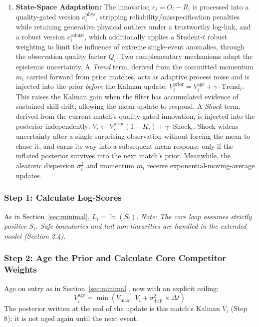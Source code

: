 \documentclass[12pt]{article}
\newcommand{\sigmai}{\sigma_i^2}
\newcommand{\sdrift}{\sigma_{\mathrm{drift}}^2}
\newcommand{\ephys}{e_i^{\mathrm{phys}}}
\newcommand{\erobust}{e_i^{\mathrm{robust}}}
\begin{document}
\begin{enumerate}
		\item \textbf{State-Space Adaptation:}
		The innovation \(e_i = O_i - R_i\) is processed into a quality-gated version \(\ephys\), stripping reliability/misspecification penalties while retaining generative physical outliers under a trustworthy log-link, and a robust version \(\erobust\), which additionally applies a Student-$t$ robust weighting to limit the influence of extreme single-event anomalies, through the observation quality factor \(Q_i\).
		Two complementary mechanisms adapt the epistemic uncertainty. A \textit{Trend} term, derived from the committed momentum \(m_i\) carried forward from prior matches, acts as adaptive process noise and is injected into the prior \emph{before} the Kalman update: \(V_i^{\mathrm{prior}} = V_i^{\mathrm{age}} + \gamma \cdot \text{Trend}_i\). This raises the Kalman gain when the filter has accumulated evidence of sustained skill drift, allowing the mean update to respond. A \textit{Shock} term, derived from the current match's quality-gated innovation, is injected into the posterior independently: \(V_i \leftarrow V_i^{\mathrm{prior}}(1 - K_i) + \gamma \cdot \text{Shock}_i\). Shock widens uncertainty after a single surprising observation without forcing the mean to chase it, and earns its way into a subsequent mean response only if the inflated posterior survives into the next match's prior.
		Meanwhile, the aleatoric dispersion \(\sigmai\) and momentum \(m_i\) receive exponential-moving-average updates.

	\end{enumerate}

	\subsubsection*{Step 1: Calculate Log-Scores}
	As in Section~\ref{sec:minimal}, $L_i = \ln(S_i)$.
	\textit{Note: The core loop assumes strictly positive $S_i$. Safe boundaries and tail non-linearities are handled in the extended model (Section 2.4).}

	\subsubsection*{Step 2: Age the Prior and Calculate Core Competitor Weights}
	Age on entry as in Section~\ref{sec:minimal}, now with an explicit ceiling:
	\begin{equation}
		V_i^{\mathrm{age}} = \min\!\left(V_{\max},\; V_i + \sdrift \times \Delta t\right)
	\end{equation}
	The posterior written at the end of the update is this match's Kalman $V_i$ (Step 8); it is not aged again until the next event.
\end{document}
